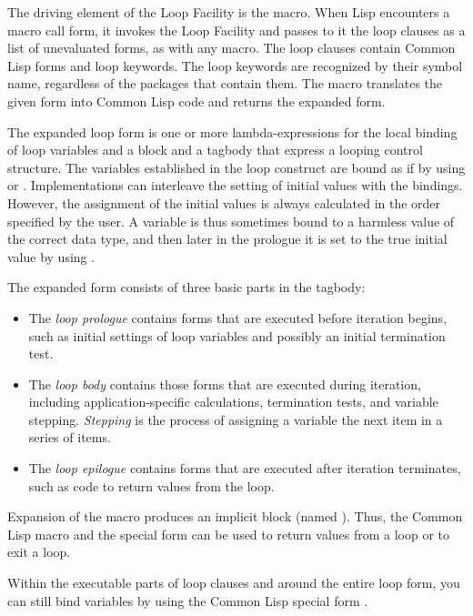\begin{new}
The driving element of the Loop Facility is the  macro.
When Lisp encounters a  macro call
form, it invokes the Loop Facility and passes to it the loop clauses
as a list of unevaluated forms, as with any macro.
The loop clauses contain Common Lisp forms and loop keywords.  The
loop keywords are recognized by their symbol name, regardless of the
packages that contain them.  The  macro translates the
given form into Common Lisp code and returns the expanded form.

The expanded loop form is
one or more lambda-expressions for the local binding of loop variables
and a block and a tagbody that express a looping control structure.   
  The variables established in the loop construct are bound as
  if by using  or .  Implementations can interleave the
  setting of initial values with the bindings.  However, the assignment
  of the initial values is always calculated in the order specified by
  the user.  A variable is thus sometimes bound to a harmless value of the
  correct data type, and then later in the prologue it is set to the true
  initial value by using .

The expanded form consists of three basic parts in the tagbody:

\begin{itemize}
\item
The {\it loop prologue\/} contains forms that are executed before iteration begins, 
such as initial settings of loop variables and possibly an initial
termination test.

\item
The {\it loop body\/}  contains those forms that are executed during iteration, 
including application-specific calculations, termination tests,
and variable stepping.  {\it Stepping\/} is the process of assigning a
variable the next item in a series of items.

\item
The {\it loop epilogue} contains forms that are executed after iteration 
terminates,
such as code to return values from the loop.
\end{itemize}


Expansion of the  macro produces an implicit block 
(named ).
Thus, the Common Lisp macro  and the special form 
 can be 
used to return values from a loop or to exit a loop.

  Within the executable parts of loop clauses and around the entire
  loop form, you can still bind variables by using the Common Lisp
  special form .




\end{new}

